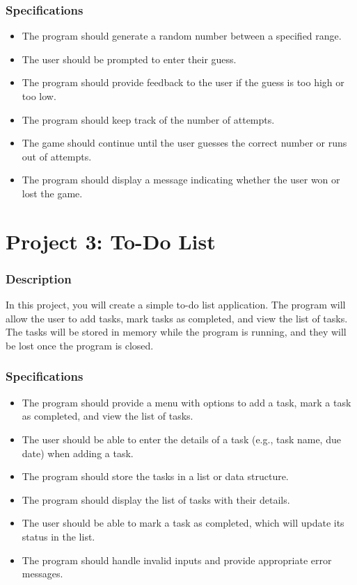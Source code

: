 \documentclass[12pt]{book}
\begin{document}
\subsubsection{Specifications}
\begin{itemize}
\item The program should generate a random number between a specified range.
\item The user should be prompted to enter their guess.
\item The program should provide feedback to the user if the guess is too high or too low.
\item The program should keep track of the number of attempts.
\item The game should continue until the user guesses the correct number or runs out of attempts.
\item The program should display a message indicating whether the user won or lost the game.
\end{itemize}

\newpage
\section{Project 3: To-Do List}

\subsubsection{Description}
In this project, you will create a simple to-do list application. The program will allow the user to add tasks, mark tasks as completed, and view the list of tasks. The tasks will be stored in memory while the program is running, and they will be lost once the program is closed.

\subsubsection{Specifications}
\begin{itemize}
\item The program should provide a menu with options to add a task, mark a task as completed, and view the list of tasks.
\item The user should be able to enter the details of a task (e.g., task name, due date) when adding a task.
\item The program should store the tasks in a list or data structure.
\item The program should display the list of tasks with their details.
\item The user should be able to mark a task as completed, which will update its status in the list.
\item The program should handle invalid inputs and provide appropriate error messages.
\end{itemize}
\end{document}
